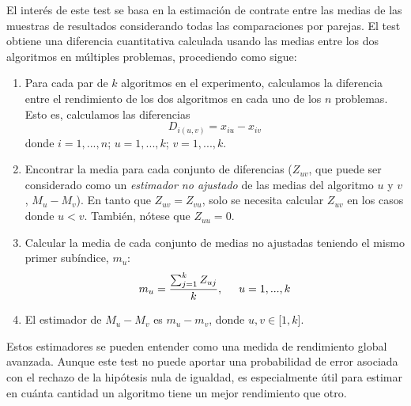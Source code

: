 El interés de este test se basa en la estimación de contrate entre las medias de las muestras de resultados considerando todas las comparaciones por parejas. 
El test obtiene una diferencia cuantitativa calculada usando las medias entre los dos algoritmos en múltiples problemas, procediendo como sigue:
\begin{enumerate}
	\item Para cada par de $k$ algoritmos en el experimento, calculamos la diferencia entre el rendimiento de los dos algoritmos en cada uno de los $n$ problemas. 
	Esto es, calculamos las diferencias
	\begin{equation}
	D_{i(u,v)} = x_{iu} - x_{iv}
	\label{eq:4.48}
	\end{equation}
	donde $i=1,...,n$; $u=1,...,k$; $v = 1,...,k$.
	\item Encontrar la media para cada conjunto de diferencias ($Z_{uv}$, que puede ser considerado como un \textit{estimador no ajustado} de las medias del algoritmo $u$ y $v$, $M_u - M_v$). 
	En tanto que $Z_{uv} = Z_{vu}$, solo se necesita calcular $Z_{uv}$ en los casos donde $u < v$. 
	También, nótese que $Z_{uu} = 0$.
	\item Calcular la media de cada conjunto de medias no ajustadas teniendo el mismo primer subíndice, $m_u$:
	\begin{equation}
	m_u = \dfrac{\sum_{j=1}^{k}Z_{uj}}{k}, \hspace{0.5cm} u = 1,...,k
	\label{eq:4.49}
	\end{equation}
	\item El estimador de $M_u-M_v$ es $m_u - m_v$, donde $u,v \in$[$1,k$].
\end{enumerate}

Estos estimadores se pueden entender como una medida de rendimiento global avanzada. 
Aunque este test no puede aportar una probabilidad de error asociada con el rechazo de la hipótesis nula de igualdad, es especialmente útil para estimar en cuánta cantidad un algoritmo tiene un mejor rendimiento que otro. 